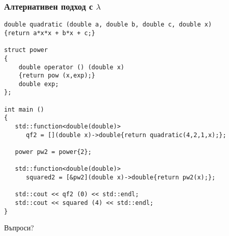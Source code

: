 \documentclass{beamer}
\begin{document}
\begin{frame}[fragile]
    \frametitle{Алтернативен подход с $\lambda$}
    
\begin{lstlisting}[basicstyle=\tiny]
double quadratic (double a, double b, double c, double x)
{return a*x*x + b*x + c;}

struct power
{
    double operator () (double x)
    {return pow (x,exp);}
    double exp;
};

int main ()
{
   std::function<double(double)> 
      qf2 = [](double x)->double{return quadratic(4,2,1,x);};

   power pw2 = power{2};

   std::function<double(double)> 
      squared2 = [&pw2](double x)->double{return pw2(x);};

   std::cout << qf2 (0) << std::endl;
   std::cout << squared (4) << std::endl;
}
\end{lstlisting}
\end{frame}



\begin{frame}
\centerline{Въпроси?}
\end{frame}
\end{document}
